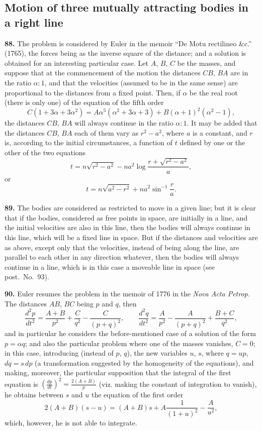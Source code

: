 \documentclass[11pt,a4paper]{article}
\theoremstyle{definition}
\begin{document}
\subsection*{Motion of three mutually attracting bodies in a right line}

\textbf{88.} The problem is considered by Euler in the memoir ``De Motu rectilineo \&c.'' (1765), the forces being as the inverse square of the distance; and a solution is obtained for an interesting particular case. Let $A$, $B$, $C$ be the masses, and suppose that at the commencement of the motion the distances $CB$, $BA$ are in the ratio $\alpha : 1$, and that the velocities (assumed to be in the same sense) are proportional to the distances from a fixed point. Then, if $\alpha$ be the real root (there is only one) of the equation of the fifth order
\[
C(1 + 3\alpha + 3\alpha^2) = A\alpha^5(\alpha^2 + 3\alpha + 3) + B(\alpha + 1)^2(\alpha^2 - 1),
\]
the distances $CB$, $BA$ will always continue in the ratio $\alpha : 1$. It may be added that the distances $CB$, $BA$ each of them vary as $r^2 - a^2$, where $a$ is a constant, and $r$ is, according to the initial circumstances, a function of $t$ defined by one or the other of the two equations
\[
t = n\sqrt{r^2 - a^2} - na^2\log\frac{r + \sqrt{r^2 - a^2}}{a},
\]
or
\[
t = n\sqrt{a^2 - r^2} + na^2\sin^{-1}\frac{r}{a}.
\]

\textbf{89.} The bodies are considered as restricted to move in a given line; but it is clear that if the bodies, considered as free points in space, are initially in a line, and the initial velocities are also in this line, then the bodies will always continue in this line, which will be a fixed line in space. But if the distances and velocities are as above, except only that the velocities, instead of being along the line, are parallel to each other in any direction whatever, then the bodies will always continue in a line, which is in this case a moveable line in space (see post.\ No.~93).

\textbf{90.} Euler resumes the problem in the memoir of 1776 in the \textit{Nova Acta Petrop.} The distances $AB$, $BC$ being $p$ and $q$, then
\[
\frac{d^2p}{dt^2} = \frac{A + B}{p^2} + \frac{C}{q^2} - \frac{C}{(p+q)^2}, \qquad
\frac{d^2q}{dt^2} = \frac{A}{p^2} - \frac{A}{(p+q)^2} + \frac{B + C}{q^2},
\]
and in particular he considers the before-mentioned case of a solution of the form $p = \alpha q$; and also the particular problem where one of the masses vanishes, $C = 0$; in this case, introducing (instead of $p$, $q$), the new variables $u$, $s$, where $q = up$, $dq = s\,dp$ (a transformation suggested by the homogeneity of the equations), and making, moreover, the particular supposition that the integral of the first equation is $\left(\frac{dp}{dt}\right)^2 = \frac{2(A+B)}{p}$ (viz. making the constant of integration to vanish), he obtains between $s$ and $u$ the equation of the first order
\[
2(A + B)(s - u) = (A + B)s + A\frac{1}{(1+u)^2} - \frac{A}{u^2},
\]
which, however, he is not able to integrate.
\end{document}
